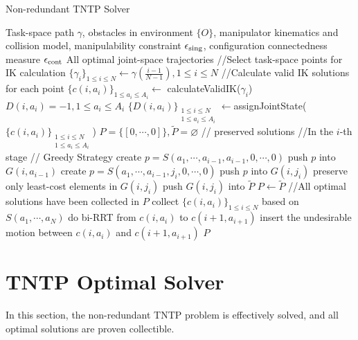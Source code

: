 \documentclass[letterpaper, 10 pt, journal, twoside]{ieeetran}  %
\begin{document}
\begin{algorithm}[H]
    \caption{Non-redundant TNTP Solver}\label{alg:1}
    \begin{algorithmic}[1]
        \Require Task-space path $\gamma$, obstacles in environment $\{O\}$, manipulator kinematics and collision model, manipulability constraint $\epsilon_{\rm sing}$, configuration connectedness measure $\epsilon_{\rm cont}$
        \Ensure All optimal joint-space trajectories 
\State //Select task-space points for IK calculation
\State $\{\gamma_i\}_{1\leq i\leq N} \leftarrow \gamma(\frac{i-1}{N-1}), 1\leq i \leq N$
\State //Calculate valid IK solutions for each point
\State $\{c(i, a_i)\}_{1\leq a_i\leq A_i}\leftarrow$ calculateValidIK($\gamma_i$)
\State $D(i, a_i) = -1, 1\leq a_i\leq A_i$
\EndFor
\State $\{D(i, a_i)\}_{\substack{1\leq i\leq N\\1\leq a_i\leq A_i}}\leftarrow $assignJointState($\{c(i, a_i)\}_{\substack{1\leq i\leq N\\1\leq a_i\leq A_i}}$)
\State $P =\{[0, \cdots, 0]\}, \tilde{P} = \varnothing$ // preserved solutions
\State //In the $i$-th stage
\State // Greedy Strategy
\State create $p = S(a_1, \cdots, a_{i-1}, a_{i-1}, 0, \cdots, 0)$
\State push $p$ into $G(i, a_{i-1})$
\Else
{}
\State create $p = S(a_1, \cdots, a_{i-1}, j_i, 0, \cdots, 0)$
\State push $p$ into $G(i, j_i)$
\EndFor
\EndIf
\EndFor
{}
\State preserve only least-cost elements in $G(i, j_i)$
\State push $G(i, j_i)$ into $\tilde{P}$
\EndFor
\State $P \leftarrow \tilde{P}$
\EndFor
\State //All optimal solutions have been collected in $P$
\State collect $\{c(i, a_i)\}_{1\leq i\leq N}$ based on $S(a_1, \cdots, a_N)$
\State do bi-RRT from $c(i, a_i)$ to $c(i+1, a_{i+1})$ 
\State insert the undesirable motion between $c(i, a_i)$ and $c(i+1, a_{i+1})$
\EndIf
\EndFor
\EndFor
\State \Return $P$
    \end{algorithmic}  
\end{algorithm}



\section{TNTP Optimal Solver}\label{section:solution}
In this section, the non-redundant TNTP problem is effectively solved, and all optimal solutions are proven collectible. 
\end{document}
